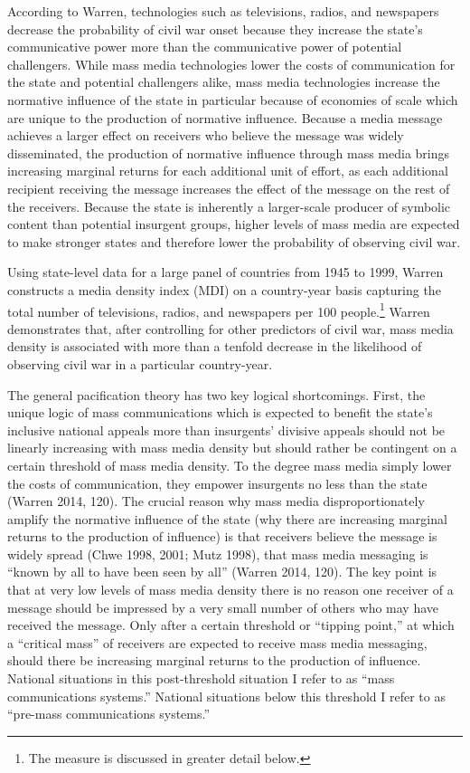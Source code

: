 \documentclass[11pt,article,oneside]{memoir}
\begin{document}
According to Warren, technologies such as televisions, radios, and
newspapers decrease the probability of civil war onset because they
increase the state's communicative power more than the communicative
power of potential challengers. While mass media technologies lower the
costs of communication for the state and potential challengers alike,
mass media technologies increase the normative influence of the state in
particular because of economies of scale which are unique to the
production of normative influence. Because a media message achieves a
larger effect on receivers who believe the message was widely
disseminated, the production of normative influence through mass media
brings increasing marginal returns for each additional unit of effort,
as each additional recipient receiving the message increases the effect
of the message on the rest of the receivers. Because the state is
inherently a larger-scale producer of symbolic content than potential
insurgent groups, higher levels of mass media are expected to make
stronger states and therefore lower the probability of observing civil
war.

Using state-level data for a large panel of countries from 1945 to 1999,
Warren constructs a media density index (MDI) on a country-year basis
capturing the total number of televisions, radios, and newspapers per
100 people.\footnote{The measure is discussed in greater detail below.}
Warren demonstrates that, after controlling for other predictors of
civil war, mass media density is associated with more than a tenfold
decrease in the likelihood of observing civil war in a particular
country-year.

The general pacification theory has two key logical shortcomings. First,
the unique logic of mass communications which is expected to benefit the
state's inclusive national appeals more than insurgents' divisive
appeals should not be linearly increasing with mass media density but
should rather be contingent on a certain threshold of mass media
density. To the degree mass media simply lower the costs of
communication, they empower insurgents no less than the state (Warren
2014, 120). The crucial reason why mass media disproportionately amplify
the normative influence of the state (why there are increasing marginal
returns to the production of influence) is that receivers believe the
message is widely spread (Chwe 1998, 2001; Mutz 1998), that mass media
messaging is ``known by all to have been seen by all'' (Warren 2014,
120). The key point is that at very low levels of mass media density
there is no reason one receiver of a message should be impressed by a
very small number of others who may have received the message. Only
after a certain threshold or ``tipping point,'' at which a ``critical
mass'' of receivers are expected to receive mass media messaging, should
there be increasing marginal returns to the production of influence.
National situations in this post-threshold situation I refer to as
``mass communications systems.'' National situations below this
threshold I refer to as ``pre-mass communications systems.''
\end{document}
